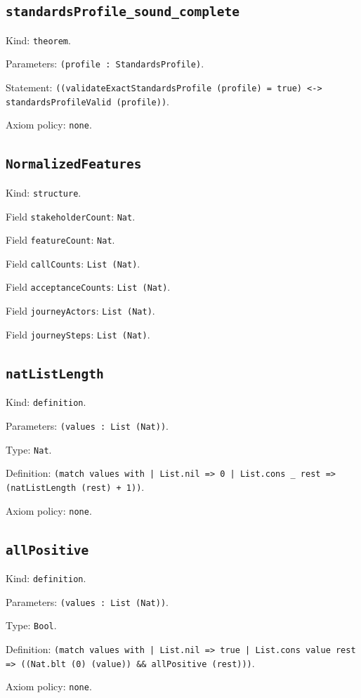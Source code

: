 \documentclass[11pt]{article}
\begin{document}
\subsection*{\texttt{standardsProfile\_sound\_complete}}
\noindent Kind: \texttt{theorem}.\par
\noindent Parameters: \texttt{(profile : StandardsProfile)}.\par
\noindent Statement: \texttt{((validateExactStandardsProfile (profile) = true) <-> standardsProfileValid (profile))}.\par
\noindent Axiom policy: \texttt{none}.\par
\subsection*{\texttt{NormalizedFeatures}}
\noindent Kind: \texttt{structure}.\par
\noindent Field \texttt{stakeholderCount}: \texttt{Nat}.\par
\noindent Field \texttt{featureCount}: \texttt{Nat}.\par
\noindent Field \texttt{callCounts}: \texttt{List (Nat)}.\par
\noindent Field \texttt{acceptanceCounts}: \texttt{List (Nat)}.\par
\noindent Field \texttt{journeyActors}: \texttt{List (Nat)}.\par
\noindent Field \texttt{journeySteps}: \texttt{List (Nat)}.\par
\subsection*{\texttt{natListLength}}
\noindent Kind: \texttt{definition}.\par
\noindent Parameters: \texttt{(values : List (Nat))}.\par
\noindent Type: \texttt{Nat}.\par
\noindent Definition: \texttt{(match values with | List.nil => 0 | List.cons \_ rest => (natListLength (rest) + 1))}.\par
\noindent Axiom policy: \texttt{none}.\par
\subsection*{\texttt{allPositive}}
\noindent Kind: \texttt{definition}.\par
\noindent Parameters: \texttt{(values : List (Nat))}.\par
\noindent Type: \texttt{Bool}.\par
\noindent Definition: \texttt{(match values with | List.nil => true | List.cons value rest => ((Nat.blt (0) (value)) \&\& allPositive (rest)))}.\par
\noindent Axiom policy: \texttt{none}.\par
\end{document}
